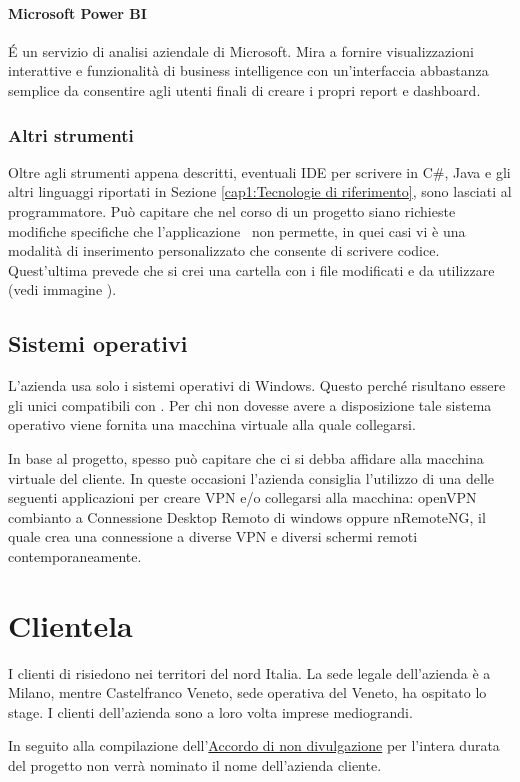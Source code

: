 \paragraph{Microsoft Power BI}
\'E un servizio di analisi aziendale di Microsoft. Mira a fornire visualizzazioni interattive e funzionalità di business intelligence con un'interfaccia abbastanza semplice da consentire agli utenti finali di creare i propri report e dashboard.

\subsubsection*{Altri strumenti}

Oltre agli strumenti appena descritti, eventuali IDE per scrivere in C\#, Java e gli altri linguaggi riportati in Sezione \ref{cap1:Tecnologie di riferimento}, sono lasciati al programmatore. Può capitare che nel corso di un progetto siano richieste  modifiche specifiche che l'applicazione \inde\ non permette, in quei casi vi è una modalità di inserimento personalizzato che consente di scrivere codice. Quest'ultima prevede che si crei una cartella con i file modificati e da utilizzare (vedi immagine \todo).


\subsection{Sistemi operativi}
\label{cap1:Sistemi operativi}

L'azienda usa  solo i sistemi operativi di Windows. Questo perché risultano essere gli unici compatibili con \inde. Per chi non dovesse avere a disposizione tale sistema operativo viene fornita una macchina virtuale alla quale collegarsi. 

In base al progetto, spesso può capitare che ci si debba affidare alla macchina virtuale del cliente. In queste occasioni l'azienda consiglia l'utilizzo di una delle seguenti applicazioni per creare VPN e/o collegarsi alla macchina: openVPN combianto a Connessione Desktop Remoto di windows oppure nRemoteNG, il quale crea una connessione a diverse VPN e diversi schermi remoti contemporaneamente. 

\newpage

\section{Clientela}
\label{cap1:Clientela}
I clienti di \azienda risiedono nei territori del nord Italia. La sede legale dell'azienda è a Milano, mentre Castelfranco Veneto, sede operativa del Veneto, ha ospitato lo stage. I clienti dell'azienda sono a loro volta imprese medio\-grandi. 

In seguito alla compilazione dell'\hyperref[NDA]{Accordo di non divulgazione} per l'intera durata del progetto non verrà nominato il nome dell'azienda cliente.